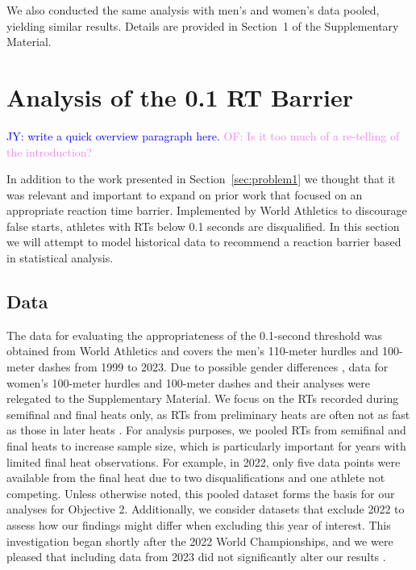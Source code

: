 \documentclass[12pt, letterpaper]{article}
\newcommand{\jy}[1]{\textcolor{blue}{JY: #1}}
\newcommand{\of}[1]{\textcolor{violet}{OF: #1}}
\begin{document}
We also conducted the same analysis with men’s and women’s data
pooled, yielding similar results. Details are provided in Section~1 of
the Supplementary Material.

\section{Analysis of the 0.1 RT Barrier}
\label{sec:problem2}

\jy{write a quick overview paragraph here.}
\of{Is it too much of a re-telling of the introduction?}

In addition to the work presented in Section~\ref{sec:problem1} we thought that
it was relevant and important to expand on prior work that focused on an
appropriate reaction time barrier.  Implemented by World Athletics to discourage
false starts, athletes with RTs below 0.1 seconds are disqualified.  In this
section we will attempt to model historical data to recommend a reaction barrier
based in statistical analysis.


\subsection{Data}
\label{sec:data_barrier}

The data for evaluating the appropriateness of the 0.1-second
threshold was obtained from World Athletics and covers the men's
110-meter hurdles and 100-meter dashes from 1999 to 2023. Due to
possible gender differences \citep{babicc2009reaction,
  lipps2011implications}, data for women's 100-meter hurdles and
100-meter dashes and their analyses were relegated to the
Supplementary Material. We focus on the RTs recorded during
semifinal and final heats only, as RTs from preliminary
heats are often not as fast as those in later heats
\citep[e.g.,][]{collet1999strategic, tonnessen2013reaction,
  brosnan2017effects, zhang2021correlation}. For analysis purposes, we
pooled RTs from semifinal and final heats to increase sample
size, which is particularly important for years with limited final heat
observations. For example, in 2022, only five data points were available
from the final heat due to two disqualifications and one athlete not
competing. Unless otherwise noted, this pooled dataset forms the basis
for our analyses for Objective 2. Additionally, we consider datasets
that exclude 2022 to assess how our findings might differ when excluding
this year of interest. This investigation began shortly after the 2022 World
Championships, and we were pleased that including data from 2023 did not
significantly alter our results \citep{WAData}.  
\end{document}
